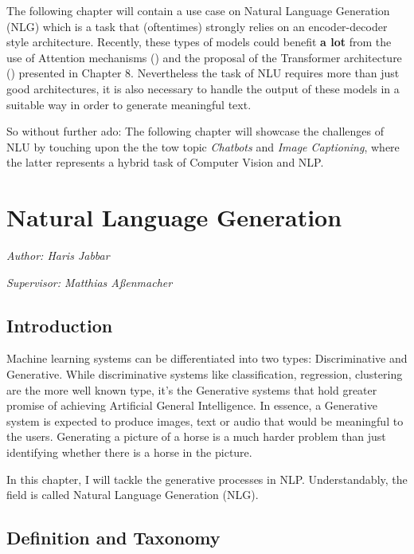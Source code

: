 \documentclass[]{krantz}
\begin{document}
The following chapter will contain a use case on Natural Language Generation (NLG) which is a task
that (oftentimes) strongly relies on an encoder-decoder style architecture. Recently, these types
of models could benefit \textbf{a lot} from the use of Attention mechanisms (\citet{bahdanau2014neural}) and the
proposal of the Transformer architecture (\citet{vaswani2017attention}) presented in Chapter 8.
Nevertheless the task of NLU requires more than just good architectures, it is also necessary to
handle the output of these models in a suitable way in order to generate meaningful text.

So without further ado: The following chapter will showcase the challenges of NLU by touching upon
the the tow topic \emph{Chatbots} and \emph{Image Captioning}, where the latter represents a hybrid task of
Computer Vision and NLP.

\hypertarget{natural-language-generation}{%
\chapter{Natural Language Generation}\label{natural-language-generation}}

\emph{Author: Haris Jabbar}

\emph{Supervisor: Matthias Aßenmacher}

\hypertarget{introduction}{%
\section{Introduction}\label{introduction}}

Machine learning systems can be differentiated into two types: Discriminative and Generative. While discriminative systems like classification, regression, clustering are the more well known type, it's the Generative systems that hold greater promise of achieving Artificial General Intelligence. In essence, a Generative system is expected to produce images, text or audio that would be meaningful to the users. Generating a picture of a horse is a much harder problem than just identifying whether there is a horse in the picture.

In this chapter, I will tackle the generative processes in NLP. Understandably, the field is called Natural Language Generation (NLG).

\hypertarget{definition-and-taxonomy}{%
\section{Definition and Taxonomy}\label{definition-and-taxonomy}}
\end{document}
